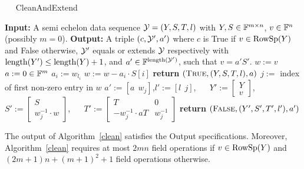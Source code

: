 \begin{algorithm}
\caption{$\quad$ \sc CleanAndExtend}
%
\label{clean}
\begin{algorithmic}
\STATE \textbf{Input:} A semi echelon data sequence $\mathcal{Y}=(Y,S,T,l)$ with 
         $Y,S \in \mathbb{F}^{m \times n}$, $v \in \mathbb{F}^n$ (possibly $m=0$).
\STATE \textbf{Output:} A triple $(c,\mathcal{Y}',a')$ where $c$ is {\sc True} 
if $v \in \mathrm{RowSp}(Y)$ and {\sc False} otherwise, $\mathcal{Y}'$ equals or 
extends $\mathcal{Y}$ respectively with $\mathrm{length}(Y') \le \mathrm{length}(Y)+1$, 
and $a'\in\mathbb{F}^{\mathrm{length} (\mathcal{Y}')}$, such that $v = a'S'$.
\vspace*{2mm}
\STATE $w := v$
\STATE $a := 0 \in \mathbb{F}^m$
    \STATE $a_i := w_{l_i}$
    \STATE $w := w - a_i \cdot S[i]$
\ENDFOR\hspace*{6mm}
    \STATE \textbf{return} $(\mbox{\sc True},(Y,S,T,l),a)$
\ELSE
    \STATE $j := $ index of first non-zero entry in $w$
    \STATE $a' := [ a \ \ w_j ]$,\quad $l' := \left[ l \ \ j \right]$, $\quad$
    \STATE $Y' := \left[ 
       \begin{array}{c} Y \\ v \end{array} \right]$, $\quad$
           $S' := \left[ 
       \begin{array}{c} S \\ w_j^{-1} \cdot w \end{array} \right]$, $\quad$
           $T' := \left[ 
       \begin{array}{cc} T & 0 \\ -w_j^{-1}\cdot aT & w_j^{-1} 
       \end{array} \right]$
    \STATE \textbf{return} $(\mbox{\sc False}, (Y',S',T',l'), a' )$
\ENDIF
\end{algorithmic}
\end{algorithm}

\begin{Prop}
%
The output of Algorithm~\ref{clean} satisfies the Output
specifications.
Moreover, Algorithm~\ref{clean} requires at most $2mn$ field operations
if $v\in\mathrm{RowSp}(Y)$ and\/
$(2m+1)n + (m+1)^2 + 1$ field operations otherwise.
\end{Prop}

